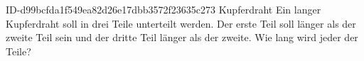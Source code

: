 \begin{exercise}
      {ID-d99bcfda1f549ea82d26e17dbb3572f23635c273}
      {Kupferdraht}
  \ifproblem\problem
    Ein   langer Kupferdraht soll in drei Teile
    unterteilt werden. Der erste Teil soll  länger als der
    zweite Teil sein und der dritte Teil  länger als der zweite.
    Wie lang wird jeder der Teile?
  \fi
\end{exercise}

